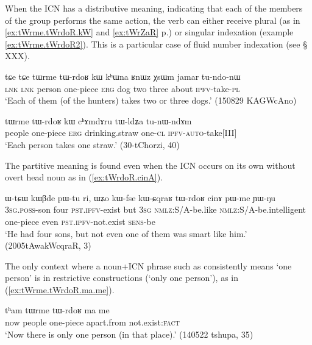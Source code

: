 When the ICN has a distributive meaning, indicating that each of the members of the group performs the same action, the verb can either receive plural (as in \ref{ex:tWrme.tWrdoR.kW} and \ref{ex:tWrZaR} p.\pageref{ex:tWrZaR}) or singular indexation (example \ref{ex:tWrme.tWrdoR2}). This is a particular case of fluid number indexation (see § XXX).

\begin{exe}
\ex \label{ex:tWrme.tWrdoR.kW}
\gll  tɕe tɕe tɯrme tɯ-rdoʁ kɯ kʰɯna ʁnɯz χsɯm jamar tu-ndo-nɯ \\
\textsc{lnk} \textsc{lnk}  person one-piece \textsc{erg} dog two three about \textsc{ipfv}-take-\textsc{pl} \\
\glt `Each of them (of the hunters) takes two or three dogs.' (150829 KAGWcAno)
\end{exe} 

\begin{exe}
\ex \label{ex:tWrme.tWrdoR2}
\gll tɯrme tɯ-rdoʁ kɯ cʰɤmdɤru tɯ-ldʑa tu-nɯ-ndɤm  \\
people one-piece \textsc{erg} drinking.straw one-\textsc{cl} \textsc{ipfv-auto}-take[III] \\
\glt `Each person takes one straw.' (30-tChorzi, 40)
\end{exe}

The partitive meaning is found even when the ICN occurs on its own without overt head noun as in (\ref{ex:tWrdoR.cinA}).

 \begin{exe}
\ex \label{ex:tWrdoR.cinA}
\gll ɯ-tɕɯ kɯβde pɯ-tu ri, ɯʑo kɯ-fse kɯ-ɕqraʁ tɯ-rdoʁ cinɤ pɯ-me ɲɯ-ŋu 	\\
\textsc{3sg.poss}-son four \textsc{pst.ipfv}-exist but \textsc{3sg} \textsc{nmlz}:S/A-be.like \textsc{nmlz}:S/A-be.intelligent one-piece even \textsc{pst.ipfv}-not.exist \textsc{sens}-be \\
\glt `He had four sons, but not even one of them was smart like him.' (2005tAwakWcqraR, 3)
\end{exe} 

The only context where a noun+ICN phrase such as  consistently means `one person' is in restrictive constructions (`only one person'), as in (\ref{ex:tWrme.tWrdoR.ma.me}).  

\begin{exe}
\ex \label{ex:tWrme.tWrdoR.ma.me}
\gll tʰam tɯrme tɯ-rdoʁ ma me \\
now people one-piece apart.from not.exist:\textsc{fact} \\
\glt `Now there is only one person (in that place).' (140522 tshupa, 35)
\end{exe} 

